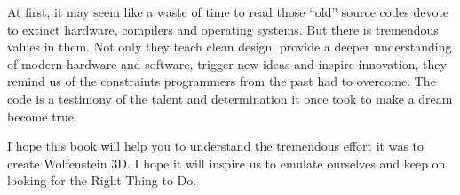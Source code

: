 \documentclass[book.tex]{subfiles}
\begin{document}
\bigskip

At first, it may seem like a waste of time to read those ``old'' source codes devote to extinct hardware, compilers and operating systems. But there is tremendous values in them. Not only they teach clean design, provide a deeper understanding of modern hardware and software, trigger new ideas and inspire innovation, they remind us of the constraints programmers from the past had to overcome. The code is a testimony of the talent and determination it once took to make a dream become true.
\bigskip

I hope this book will help you to understand the tremendous effort it was to create Wolfenstein 3D. I hope it will inspire us to emulate ourselves and keep on looking for the Right Thing to Do.
\end{document}
